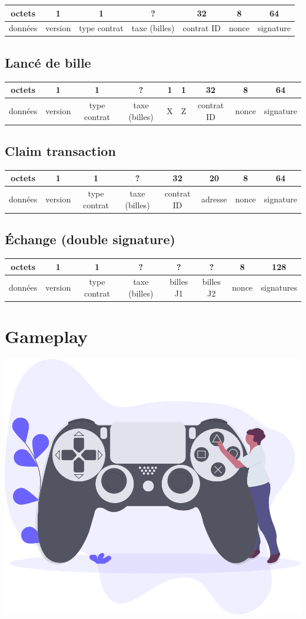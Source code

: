 \documentclass{article}
\begin{document}
\hspace*{-1cm}%
\begin{tabular}{ |c|c|c|c|c|c|c|} 
 \hline
 octets & 1 & 1 & ? & 32 & 8 & 64\\ 
 \hline
    données & version & type contrat & taxe (billes) & contrat ID & nonce & signature\\ 
 \hline
\end{tabular}

\subsection{Lancé de bille}
\hspace*{-1cm}%
\begin{tabular}{ |c|c|c|c|c|c|c|c|c|} 
 \hline
 octets & 1 & 1 & ? & 1 & 1 & 32 & 8 & 64 \\ 
 \hline
    données & version & type contrat & taxe (billes) & X & Z & contrat ID & nonce & signature\\ 
 \hline
\end{tabular}

\subsection{Claim transaction}
\hspace*{-1cm}%
\begin{tabular}{ |c|c|c|c|c|c|c|c|} 
 \hline
 octets & 1 & 1 & ? & 32 & 20 & 8 & 64 \\ 
 \hline
    données & version & type contrat & taxe (billes) & contrat ID & adresse & nonce & signature\\ 
 \hline
\end{tabular}

\subsection{Échange (double signature)}
\hspace*{-1cm}%
\begin{tabular}{ |c|c|c|c|c|c|c|c|} 
 \hline
 octets & 1 & 1 & ? & ? & ? & 8 & 128\\ 
 \hline
    données & version & type contrat & taxe (billes) & billes J1 & billes J2 & nonce & signatures\\ 
 \hline
\end{tabular}

\section{Gameplay}
\includegraphics[width=0.3\linewidth]{assets/gaming.png}\\
\end{document}
